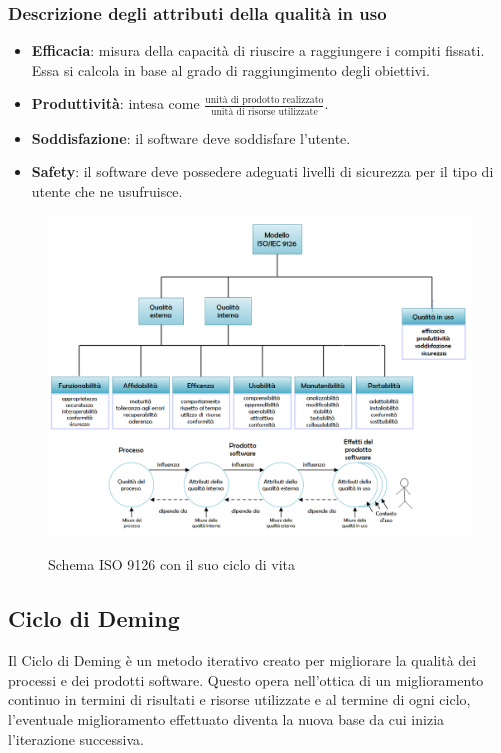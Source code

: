 		\subsubsection{Descrizione degli attributi della qualità in uso}
		\begin{itemize}
			\item \textbf{Efficacia}: misura della capacità di riuscire a raggiungere i compiti fissati. Essa si calcola in base al grado di raggiungimento degli obiettivi.
			\item \textbf{Produttività}: intesa come $ \frac{\text{unità di prodotto realizzato}}{\text{unità di risorse utilizzate}} $.
			\item \textbf{Soddisfazione}: il software deve soddisfare l'utente.
			\item \textbf{Safety}: il software deve possedere adeguati livelli di sicurezza per il tipo di utente che ne usufruisce.
		\end{itemize}

	\begin{figure}[H]
		\includegraphics[width=\textwidth]{img/ISO9126_full.png}
		\label{fig:iso9126}
		\caption[Schema ISO 9126 con il suo ciclo di vita]{Schema ISO 9126 con il suo ciclo di vita\protect\footnotemark}
	\end{figure}


	\subsection{Ciclo di Deming}\label{cicloDeming}
	Il Ciclo di Deming è un metodo iterativo creato per migliorare la qualità dei processi e dei prodotti software.
	Questo opera nell'ottica di un miglioramento continuo in termini di risultati e risorse utilizzate e al termine di ogni ciclo,
	l'eventuale miglioramento effettuato diventa la nuova base da cui inizia l'iterazione successiva.

